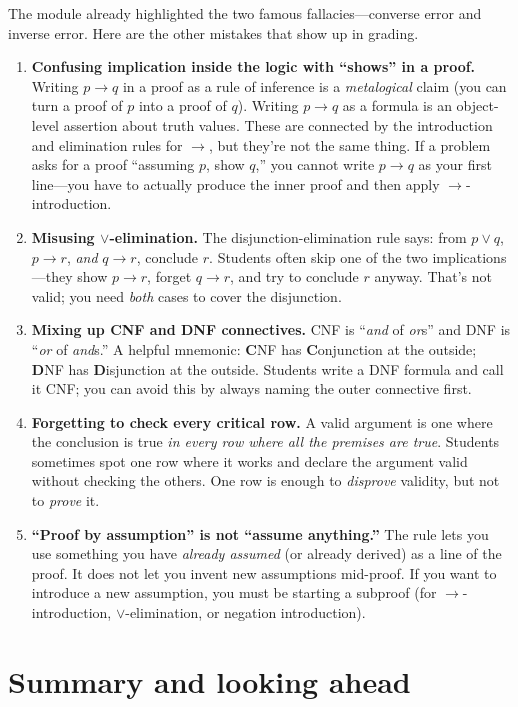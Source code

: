 \documentclass[11pt]{article}
\begin{document}
The module already highlighted the two famous fallacies---converse error and inverse error. Here are the other mistakes that show up in grading.
\begin{enumerate}
  \item \textbf{Confusing implication inside the logic with ``shows'' in a proof.} Writing $p \to q$ in a proof as a rule of inference is a \emph{metalogical} claim (you can turn a proof of $p$ into a proof of $q$). Writing $p \to q$ as a formula is an object-level assertion about truth values. These are connected by the introduction and elimination rules for $\to$, but they're not the same thing. If a problem asks for a proof ``assuming $p$, show $q$,'' you cannot write $p \to q$ as your first line---you have to actually produce the inner proof and then apply $\to$-introduction.
  \item \textbf{Misusing $\vee$-elimination.} The disjunction-elimination rule says: from $p \vee q$, $p \to r$, \emph{and} $q \to r$, conclude $r$. Students often skip one of the two implications---they show $p \to r$, forget $q \to r$, and try to conclude $r$ anyway. That's not valid; you need \emph{both} cases to cover the disjunction.
  \item \textbf{Mixing up CNF and DNF connectives.} CNF is ``\emph{and} of \emph{or}s'' and DNF is ``\emph{or} of \emph{and}s.'' A helpful mnemonic: \textbf{C}NF has \textbf{C}onjunction at the outside; \textbf{D}NF has \textbf{D}isjunction at the outside. Students write a DNF formula and call it CNF; you can avoid this by always naming the outer connective first.
  \item \textbf{Forgetting to check every critical row.} A valid argument is one where the conclusion is true \emph{in every row where all the premises are true}. Students sometimes spot one row where it works and declare the argument valid without checking the others. One row is enough to \emph{disprove} validity, but not to \emph{prove} it.
  \item \textbf{``Proof by assumption'' is not ``assume anything.''} The rule lets you use something you have \emph{already assumed} (or already derived) as a line of the proof. It does not let you invent new assumptions mid-proof. If you want to introduce a new assumption, you must be starting a subproof (for $\to$-introduction, $\vee$-elimination, or negation introduction).
\end{enumerate}

\section{Summary and looking ahead}
\end{document}
